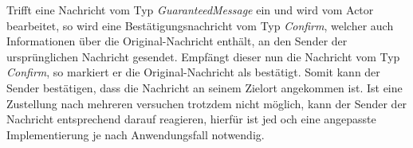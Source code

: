 Trifft eine Nachricht vom Typ \textit{GuaranteedMessage} ein und wird vom Actor bearbeitet, so wird eine Bestätigungsnachricht vom Typ \textit{Confirm}, welcher auch Informationen über die Original-Nachricht enthält, an den Sender der ursprünglichen Nachricht gesendet. Empfängt dieser nun die Nachricht vom Typ \textit{Confirm}, so markiert er die Original-Nachricht als bestätigt. Somit kann der Sender bestätigen, dass die Nachricht an seinem Zielort angekommen ist. Ist eine Zustellung nach mehreren versuchen trotzdem nicht möglich, kann der Sender der Nachricht entsprechend darauf reagieren, hierfür ist jed  och eine angepasste Implementierung je nach Anwendungsfall notwendig. \\